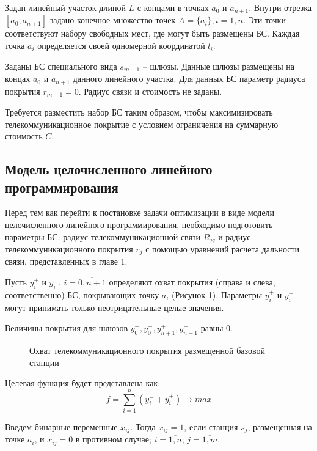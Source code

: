 Задан линейный участок длиной $L$ с концами в точках $a_0$ и $a_{n+1}$. Внутри  отрезка $[a_0, a_{n+1}]$ задано конечное множество точек $A=\{a_i\}, i=\overline{1,n}$. Эти точки соответствуют набору свободных мест, где могут быть размещены БС. Каждая точка $a_i$ определяется своей одномерной координатой $l_i$.

Заданы БС специального вида $s_{m+1}$ -- шлюзы. Данные шлюзы размещены на концах $a_0$ и $a_{n+1}$ данного линейного участка. Для данных БС параметр радиуса покрытия $r_{m+1}=0$. Радиус связи и стоимость не заданы.

Требуется разместить набор БС таким образом, чтобы максимизировать телекоммуникационное покрытие с условием ограничения на суммарную стоимость $C$.


\subsection{Модель целочисленного линейного программирования}

Перед тем как перейти к постановке задачи оптимизации в виде модели целочисленного линейного программирования, необходимо подготовить параметры БС: радиус телекоммуникационной связи $R_{jq}$ и радиус телекоммуникационного покрытия $r_j$ с помощью уравнений расчета дальности связи, представленных в главе 1.



Пусть $y_i^+$ и $y_i^-$, $i= \overline{0,n+1}$ определяют охват покрытия (справа и слева, соответственно) БС, покрывающих точку $a_i$ (Рисунок \cref{fig:part3_station_coverage}). Параметры $y_i^+$ и $y_i^-$ могут принимать только неотрицательные целые значения.

Величины  покрытия для шлюзов $y_0^+, y_0^-, y_{n+1}^+, y_{n+1}^-$ равны 0.

\begin{figure}[ht]
  \caption{Охват телекоммуникационного покрытия размещенной базовой станции}\label{fig:part3_station_coverage}
\end{figure}
 
Целевая функция будет представлена как:
\begin{equation}
  \label{eq:part3_objective_function}
  f =  \sum\limits_{i=1}^n (y_i^- + y_i^+) \rightarrow max
\end{equation}

Введем бинарные переменные $x_{ij}$. Тогда $x_{ij}=1$, если станция $s_j$, размещенная на точке $a_i$, и $x_{ij}=0$ в противном случае; $i= \overline{1, n}$; $j = \overline{1,m}$.

